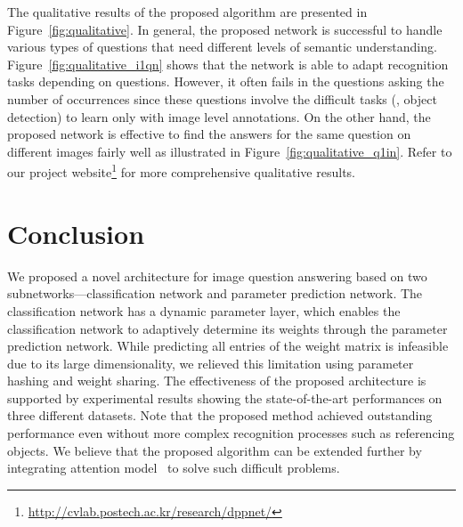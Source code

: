 \documentclass[10pt,twocolumn,letterpaper]{article}
\begin{document}
\begin{figure*}[t]
\caption{Sample images and questions in VQA dataset~\cite{VQA}. Each question requires a different type and/or level of understanding of the corresponding input image to find correct answer. Answers in blue are correct while answers in red are incorrect. For the incorrect answers,  ground-truth answers are provided within the parentheses.}
\label{fig:qualitative}
\end{figure*}


The qualitative results of the proposed algorithm are presented in Figure~\ref{fig:qualitative}.
In general, the proposed network is successful to handle various types of questions that need different levels of semantic understanding.
Figure~\ref{fig:qualitative_i1qn} shows that the network is able to adapt recognition tasks depending on questions.
However, it often fails in the questions asking the number of occurrences since these questions involve the difficult tasks (\eg, object detection) to learn only with image level annotations.
On the other hand, the proposed network is effective to find the answers for the same question on different images fairly well as illustrated in Figure~\ref{fig:qualitative_q1in}.
Refer to our project website\footnote{\url{http://cvlab.postech.ac.kr/research/dppnet/}} for more comprehensive qualitative results.







\section{Conclusion}
We proposed a novel architecture for image question answering based on two subnetworks---classification network and parameter prediction network.
The classification network has a dynamic parameter layer, which enables the classification network to adaptively determine its weights through the parameter prediction network.
While predicting all entries of the weight matrix is infeasible due to its large dimensionality, we relieved this limitation using parameter hashing and weight sharing.
The effectiveness of the proposed architecture is supported by experimental results showing the state-of-the-art performances on three different datasets.
Note that the proposed method achieved outstanding performance even without more complex recognition processes such as referencing objects.
We believe that the proposed algorithm can be extended further by integrating attention model~\cite{Showattend} to solve such difficult problems.

{\small


}
\end{document}
